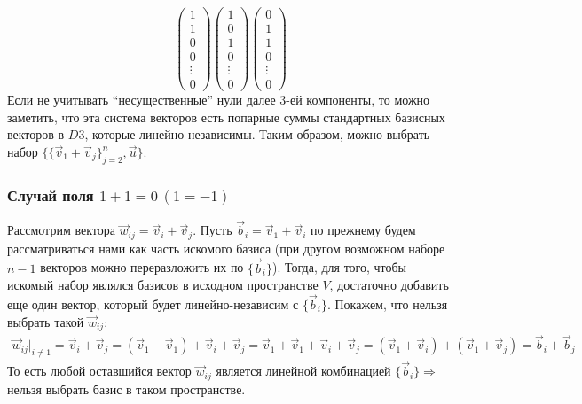 \begin{equation}
    \begin{pmatrix}
        1 \\ 1 \\ 0 \\ 0 \\ \vdots \\ 0
    \end{pmatrix}
    \begin{pmatrix}
        1 \\ 0 \\ 1 \\ 0 \\ \vdots \\ 0
    \end{pmatrix}
    \begin{pmatrix}
        0 \\ 1 \\ 1 \\ 0 \\ \vdots \\ 0
    \end{pmatrix}
\end{equation}
Если не учитывать ``несущественные'' нули далее 3-ей компоненты, то можно заметить, что эта система векторов есть попарные суммы стандартных базисных векторов в $D3$, которые линейно-независимы. Таким образом, можно выбрать набор $\{\{\vec{v}_1 + \vec{v}_j\}^{n}_{j = 2}, \vec{u}\}$.

\subsubsection{Случай поля $1+1=0 \, (1 = -1)$}
\label{sec:char2}
Рассмотрим вектора $\vec{w}_{ij} = \vec{v}_i + \vec{v}_j$.
Пусть $\vec{b}_i = \vec{v}_1 + \vec{v}_i$ по прежнему будем рассматриваться нами как часть искомого базиса (при другом возможном наборе $n-1$ векторов можно переразложить их по $\{\vec{b}_i\}$).
Тогда, для того, чтобы искомый набор являлся базисов в исходном пространстве $V$, достаточно добавить еще один вектор, который будет линейно-независим с $\{\vec{b}_i\}$.
Покажем, что нельзя выбрать такой $\vec{w}_{ij}$:
\begin{gather}
    \vec{w}_{ij}\big|_{i \neq 1} = \vec{v}_i + \vec{v}_j = (\vec{v}_1 - \vec{v}_1) + \vec{v}_i + \vec{v}_j = \vec{v}_1 + \vec{v}_1 + \vec{v}_i + \vec{v}_j = 
    (\vec{v}_1 + \vec{v}_i) + (\vec{v}_1 + \vec{v}_j) = \vec{b}_i + \vec{b}_j
\end{gather}
То есть любой оставшийся вектор $\vec{w}_{ij}$ является линейной комбинацией $\{\vec{b}_i\} \Longrightarrow$ нельзя выбрать базис в таком пространстве.

